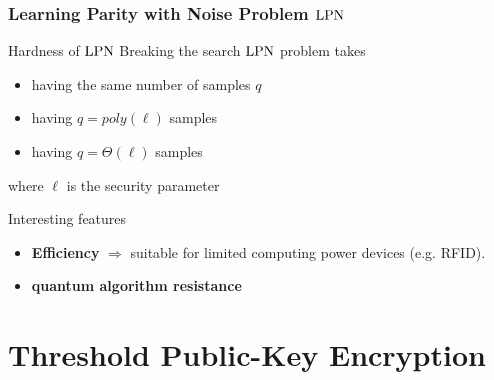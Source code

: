 \begin{frame}
 \frametitle{Learning Parity with Noise Problem $\mathrm{LPN}$}

  \begin{block}{Hardness of $\mathrm{LPN}$}
  Breaking the search $\mathrm{LPN}$ problem takes
  



   \begin{itemize}[<+->]
    \item {} having the same number of samples $q$
    \item {} having $q=poly(\ell)$ samples
    \item {} having $q= \mathcal{\varTheta}(\ell)$ samples
   \end{itemize} 
where $\ell$ is the security parameter
  \end{block}

  \begin{block}{Interesting features}
    \begin{itemize}
      \item \textbf{Efficiency} $\Rightarrow$ suitable for limited computing power devices (e.g. RFID).
      \item \textbf{quantum algorithm resistance}
    \end{itemize}
  \end{block}

\end{frame}

\section{Threshold Public-Key Encryption}

